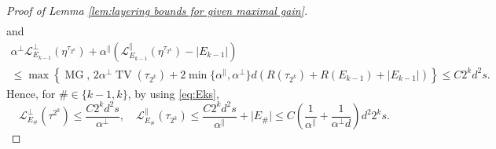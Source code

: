 \documentclass[11pt, reqno]{amsart}
\DeclareMathOperator{\TV}{TV}
\DeclareMathOperator{\MG}{MG}
\numberwithin{equation}{section}
\begin{document}
\begin{proof} [Proof of Lemma \ref{lem:layering bounds for given maximal gain}]
\begin{multline*}
\end{multline*}
and
\begin{multline*}
\alpha^{\perp}\mathcal{L}^{\perp}_{E_{k-1}}(\eta^{\tau_{2^k}})+ \alpha^{\parallel} \left( \mathcal{L}^{\parallel}_{E_{k-1}}(\eta^{\tau_{2^k}}) -|E_{k-1}| \right) \\
\leq \max\left\{  \MG,\, 2\alpha^{\perp}\TV\left(\tau_{2^k}\right)+2\min \{ \alpha^{\parallel}, \alpha^{\perp} \}d\left(R(\tau_{2^k})+R\left(E_{k-1}\right)+\lvert E_{k-1}\rvert\right)\right\}\leq C 2^k d^2 s.
\end{multline*}
Hence, for $\# \in \{k-1,k\}$, by using \eqref{eq:Eks},
\begin{equation*}
\mathcal{L}^{\perp}_{E_{\#}}(\tau^{2^k}) \leq  \frac{C2^k d^2 s }{\alpha^{\perp}},\quad \mathcal{L}^{\parallel}_{E_{\#}}(\tau_{2^k}) \leq \frac{C 2^k d^2 s}{\alpha^{\parallel}}+\lvert E_{\#}\rvert\leq C \left( \frac{1}{\alpha^{\parallel}} +\frac{1 }{\alpha^{\perp}d}\right) d^2 2^{k} s.    \end{equation*}
       

\end{proof}
\end{document}
